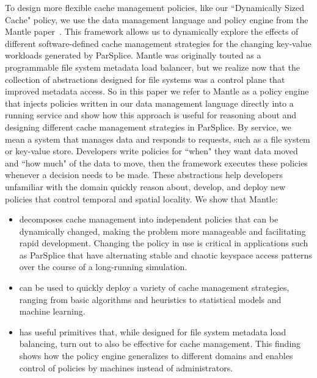 To design more flexible cache management policies, like our ``Dynamically
Sized Cache" policy, we use the data management language and policy engine
from the Mantle paper~\cite{sevilla:sc15-mantle}. This framework allows us to
dynamically explore the effects of different software-defined cache management
strategies for the changing key-value workloads generated by ParSplice.  Mantle
was originally touted as a programmable file system metadata load balancer, but
we realize now that the collection of abstractions designed for file systems
was a control plane that improved metadata access. So in this paper we refer to
Mantle as a policy engine that injects policies written in our data management
language directly into a running service and show how this approach is useful
for reasoning about and designing different cache management strategies in
ParSplice.  By service, we mean a system that manages data and responds to
requests, such as a file system or key-value store.  Developers write policies
for ``when" they want data moved and ``how much" of the data to move, then the
framework executes these policies whenever a decision needs to be made.  These
abstractions help developers unfamiliar with the domain quickly reason about,
develop, and deploy new policies that control temporal and spatial locality. We
show that Mantle:

\begin{itemize}

  \item decomposes cache management into independent policies that can be
  dynamically changed, making the problem more manageable and facilitating rapid
  development. Changing the policy in use is critical in applications such as
  ParSplice that have alternating stable and chaotic keyspace access patterns
  over the course of a long-running simulation.  

  \item can be used to quickly deploy a variety of cache management strategies,
  ranging from basic algorithms and heuristics to statistical models and machine
  learning.

  \item has useful primitives that, while designed for file system metadata
  load balancing, turn out to also be effective for cache management. This
  finding shows how the policy engine generalizes to different domains and
  enables control of policies by machines instead of administrators.

\end{itemize}

